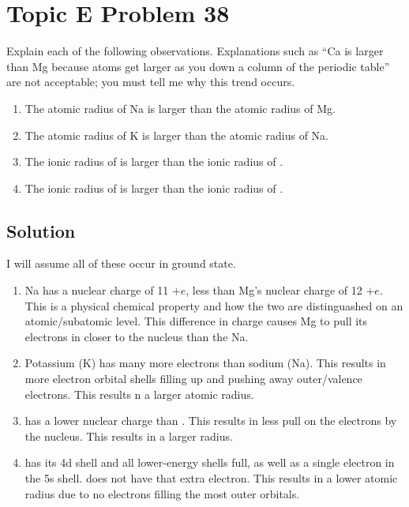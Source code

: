 \documentclass[10pt]{article}
\begin{document}
    \pagebreak
    \section{Topic E Problem 38}
        Explain each of the following observations. 
        Explanations such as “Ca is larger than Mg because atoms get larger as you down a column of the periodic table” are not acceptable; you must tell me why this trend occurs.
        \begin{enumerate}[label=\alph*)]
            \item   The atomic radius of Na is larger than the atomic radius of Mg.
            \item   The atomic radius of K is larger than the atomic radius of Na.
            \item   The ionic radius of  is larger than the ionic radius of .
            \item   The ionic radius of  is larger than the ionic radius of .
        \end{enumerate}

        \subsection{Solution}
            I will assume all of these occur in ground state.
            \begin{enumerate}[label=\alph*/]
                \item   Na has a nuclear charge of 11 $+e$, less than Mg's nuclear charge of 12 $+e$. This is a physical chemical property and how the two are distinguashed on an atomic/subatomic level. This difference in charge causes Mg to pull its electrons in closer to the nucleus than the Na.
                \item   Potassium (K) has many more electrons than sodium (Na). This results in more electron orbital shells filling up and pushing away outer/valence electrons. This results n a larger atomic radius.
                \item   {} has a lower nuclear charge than . This results in less pull on the electrons by the nucleus. This results in a larger radius.
                \item   {} has its 4d shell and all lower-energy shells full, as well as a single electron in the 5s shell.  does not have that extra electron. This results in a lower atomic radius due to no electrons filling the most outer orbitals.
            \end{enumerate}
        
\end{document}
